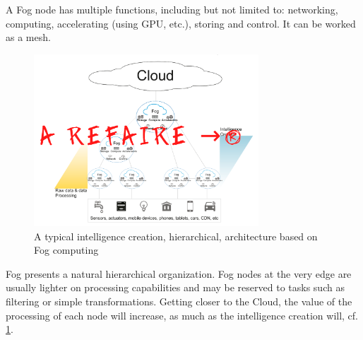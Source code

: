 \documentclass[11pt]{sdm}
\begin{document}
\begin{description}
	A Fog node has multiple functions, including but not limited to: networking, computing, accelerating (using \gls{GPU}, etc.), storing and control. It can be worked as a mesh.
	
	\begin{figure}[t]
		\centering
		\includegraphics[width=0.75\textwidth]{./assets/FogArchi.png}
		\caption{A typical intelligence creation, hierarchical, architecture based on Fog computing}
		\label{fig:fog_archi}
	\end{figure}
	
	Fog presents a natural hierarchical organization. Fog nodes at the very edge are usually lighter on processing capabilities and may be reserved to tasks such as filtering or simple transformations. Getting closer to the Cloud, the value of the processing of each node will increase, as much as the intelligence creation will, cf. \cref{fig:fog_archi}.
	
	

\end{description}
\end{document}
